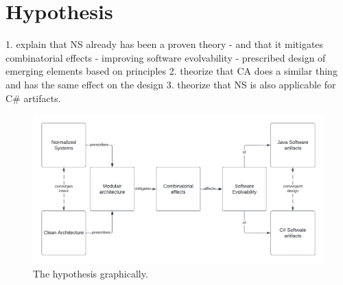\section{Hypothesis} \label{hypothesis}
1. explain that NS already has been a proven theory
    - and that it mitigates combinatorial effects
    - improving software evolvability
    - prescribed design of emerging elements based on principles
2. theorize that CA does a similar thing and has the same effect on the design
3. theorize that NS is also applicable for C\# artifacts.

\begin{figure}[!h]
    \centering
    \includegraphics[width=1\textwidth]{Figures/hypothesis.pdf}
    \caption[The hypothesis graphically.]{The hypothesis graphically.}
    \label{fig:hypothesis}
\end{figure}